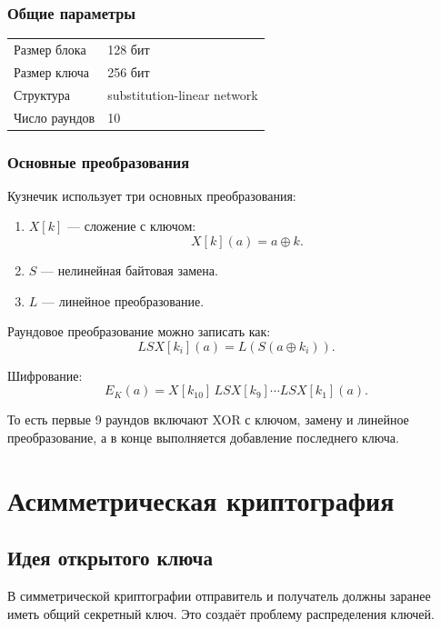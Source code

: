 \documentclass[12pt,a4paper]{article}
\begin{document}
\subsubsection{Общие параметры}

\begin{center}
\begin{tabular}{ll}
\toprule
Размер блока & 128 бит \\
Размер ключа & 256 бит \\
Структура & substitution-linear network \\
Число раундов & 10 \\
\bottomrule
\end{tabular}
\end{center}

\subsubsection{Основные преобразования}

Кузнечик использует три основных преобразования:

\begin{enumerate}
    \item $X[k]$ --- сложение с ключом:
    \[
        X[k](a)=a\oplus k.
    \]
    \item $S$ --- нелинейная байтовая замена.
    \item $L$ --- линейное преобразование.
\end{enumerate}

Раундовое преобразование можно записать как:
\[
    LSX[k_i](a)=L(S(a\oplus k_i)).
\]

Шифрование:
\[
    E_{K}(a)=X[k_{10}]\,LSX[k_9]\cdots LSX[k_1](a).
\]

То есть первые 9 раундов включают XOR с ключом, замену и линейное преобразование, а в конце выполняется добавление последнего ключа.

\section{Асимметрическая криптография}

\subsection{Идея открытого ключа}

В симметрической криптографии отправитель и получатель должны заранее иметь общий секретный ключ. Это создаёт проблему распределения ключей.
\end{document}

